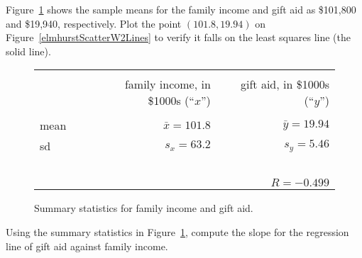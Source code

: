 \begin{exercisewrap}
\begin{nexercise}
Figure~\ref{summaryStatsOfSATGPAData} shows the sample means for the family income and gift aid as \$101,800 and \$19,940, respectively. Plot the point $(101.8, 19.94)$ on Figure~\vref{elmhurstScatterW2Lines} to verify it falls on the least squares line (the solid line).\footnotemark
\end{nexercise}
\end{exercisewrap}

\begin{figure}[ht]
\centering
\begin{tabular}{l rr}
\hline
\vspace{-4mm} & & \\
\vspace{0.4mm}	&	\ \ family income, in \$1000s (``$x$'')	& \ \ gift aid, in \$1000s (``$y$'') \\
\hline
  \vspace{-3.9mm} & & \\
mean	& $\bar{x} = 101.8$		& $\bar{y} = 19.94$ \\
sd		& $s_x = 63.2$		& $s_y = 5.46$\vspace{0.4mm} \\
\hline
\vspace{-4mm}\ &\\
	& \multicolumn{2}{r}{$R=-0.499$} \\
\hline
\end{tabular}
\caption{Summary statistics for family income and gift aid.}
\label{summaryStatsOfSATGPAData}
\end{figure}

\begin{exercisewrap}
\begin{nexercise} \label{findingTheSlopeOfTheLSRLineForIncomeAndAid}
Using the summary statistics in Figure~\ref{summaryStatsOfSATGPAData}, compute the slope for the regression line of gift aid against family income.\footnotemark
\end{nexercise}
\end{exercisewrap}

